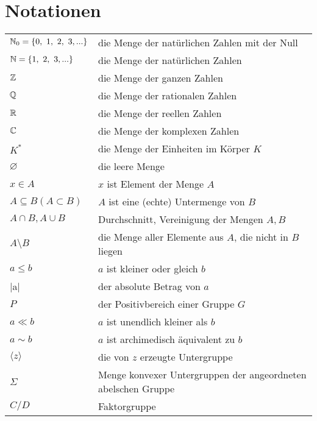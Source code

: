 \chapter{Notationen}

\begin{center}
\begin{tabular}{ll}
  $\mathbb{N}_0 = \lbrace 0,~1,~2,~3,...\rbrace$ & die Menge der natürlichen Zahlen mit der Null	\\
  $\mathbb{N} = \lbrace 1,~2,~3,...\rbrace$ & die Menge der natürlichen Zahlen \\
  $\mathbb{Z}$ & die Menge der ganzen Zahlen\\
  $\mathbb{Q}$ & die Menge der rationalen Zahlen\\
  $\mathbb{R}$ & die Menge der reellen Zahlen\\
  $\mathbb{C}$ & die Menge der komplexen Zahlen\\
  $K^*$& die Menge der Einheiten im Körper $K$\\
  $\varnothing$ & die leere Menge \\
  $x \in A$ & $x$ ist Element der Menge $A$\\
  $A\subseteq B (A \subset B)$& $A$ ist eine (echte) Untermenge von $B$ \\
  $A \cap B, A \cup B$ & Durchschnitt, Vereinigung der Mengen $A, B$\\
  $A \setminus B$ & die Menge aller Elemente aus $A$, die nicht in $B$ liegen \\
  $ a \leq b$ & $a$ ist kleiner oder gleich $b$\\
  |a| & der absolute Betrag von $a$\\
  $P$ & der Positivbereich einer Gruppe $G$ \\
  $a \ll b$ & $a$ ist unendlich kleiner als $b$\\
  $a \sim b$ & $a$ ist archimedisch äquivalent zu $b$\\
  $\langle z \rangle$ & die von $z$ erzeugte Untergruppe\\
  $\Sigma$ & Menge konvexer Untergruppen der angeordneten abelschen Gruppe\\
  $C/D$ & Faktorgruppe\\
 \end{tabular}
\end{center}